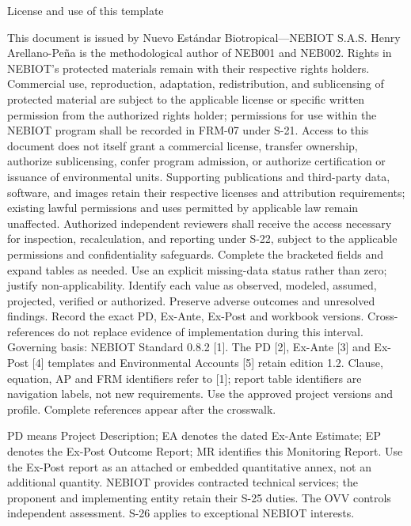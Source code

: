 \clearpage
{\fontsize{23}{27}\selectfont\color{NEBGreen}License and use of this template\par}
\vspace{4mm}
This document is issued by Nuevo Estándar Biotropical—NEBIOT S.A.S. Henry Arellano-Peña is the methodological author of NEB001 and NEB002. Rights in NEBIOT's protected materials remain with their respective rights holders. Commercial use, reproduction, adaptation, redistribution, and sublicensing of protected material are subject to the applicable license or specific written permission from the authorized rights holder; permissions for use within the NEBIOT program shall be recorded in FRM-07 under S-21. Access to this document does not itself grant a commercial license, transfer ownership, authorize sublicensing, confer program admission, or authorize certification or issuance of environmental units. Supporting publications and third-party data, software, and images retain their respective licenses and attribution requirements; existing lawful permissions and uses permitted by applicable law remain unaffected. Authorized independent reviewers shall receive the access necessary for inspection, recalculation, and reporting under S-22, subject to the applicable permissions and confidentiality safeguards.
Complete the bracketed fields and expand tables as needed. Use an explicit missing-data status rather than zero; justify non-applicability. Identify each value as observed, modeled, assumed, projected, verified or authorized. Preserve adverse outcomes and unresolved findings. Record the exact PD, Ex-Ante, Ex-Post and workbook versions. Cross-references do not replace evidence of implementation during this interval.
Governing basis: NEBIOT Standard 0.8.2 [1]. The PD [2], Ex-Ante [3] and Ex-Post [4] templates and Environmental Accounts [5] retain edition 1.2. Clause, equation, AP and FRM identifiers refer to [1]; report table identifiers are navigation labels, not new requirements. Use the approved project versions and profile. Complete references appear after the crosswalk.\par
PD means Project Description; EA denotes the dated Ex-Ante Estimate; EP denotes the Ex-Post Outcome Report; MR identifies this Monitoring Report. Use the Ex-Post report as an attached or embedded quantitative annex, not an additional quantity. NEBIOT provides contracted technical services; the proponent and implementing entity retain their S-25 duties. The OVV controls independent assessment. S-26 applies to exceptional NEBIOT interests.
